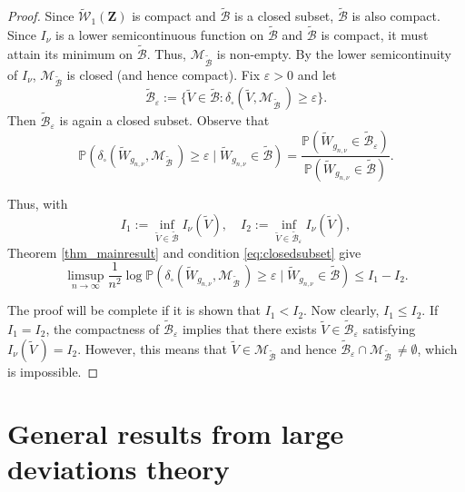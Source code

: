\documentclass[12pt,twoside,a4paper]{article}
\newcommand{\Space}{\mathbf{Z}}
\begin{document}
\begin{proof}
Since $\widetilde{\mathcal{W}}_1(\Space)$ is compact and $\widetilde{\mathcal{B}}$ is a closed subset, $\widetilde{\mathcal{B}}$ is also compact. Since $I_\nu$ is a lower semicontinuous function on $\widetilde{\mathcal{B}}$  and $\widetilde{\mathcal{B}}$ is compact, it must attain its minimum on $\widetilde{\mathcal{B}}$. Thus, $\mathscr{M}_{\widetilde{\mathcal{B}}}$ is non-empty. By the lower semicontinuity of $I_\nu$, $\mathscr{M}_{\widetilde{\mathcal{B}}}$ is closed (and hence compact). Fix $\varepsilon > 0$ and let
\[
\widetilde{\mathcal{B}}_\varepsilon := \{\widetilde{V} \in \widetilde{\mathcal{B}} : \delta_{\square}(\widetilde{V}, \mathscr{M}_{\widetilde{\mathcal{B}}}\,) \geq \varepsilon \}.
\]
Then $\widetilde{\mathcal{B}}_\varepsilon$ is again a closed subset. Observe that
\[
\mathbb{P}(\delta_{\square}(\widetilde{W}_{g_{n,\nu}}, \mathscr{M}_{\widetilde{\mathcal{B}}}\,) \geq \varepsilon \mid \widetilde{W}_{g_{n,\nu}} \in \widetilde{\mathcal{B}}) = \frac{\mathbb{P}(\widetilde{W}_{g_{n,\nu}} \in \widetilde{\mathcal{B}}_\varepsilon)}{\mathbb{P}(\widetilde{W}_{g_{n,\nu}} \in \widetilde{\mathcal{B}})}.
\]

Thus, with
\[
I_1 := \inf_{\widetilde{V} \in \widetilde{\mathcal{B}}} I_\nu(\widetilde{V}), \quad I_2 := \inf_{\widetilde{V} \in \widetilde{\mathcal{B}}_\varepsilon} I_\nu(\widetilde{V}),
\]
Theorem \ref{thm_mainresult} and condition \eqref{eq:closedsubset} give
\[
\limsup_{n \to \infty} \frac{1}{n^2} \log \mathbb{P}(\delta_{\square}(\widetilde{W}_{g_{n,\nu}}, \mathscr{M}_{\widetilde{\mathcal{B}}}\,) \geq \varepsilon \mid \widetilde{W}_{g_{n,\nu}} \in \widetilde{\mathcal{B}}) \leq I_1 - I_2.
\]

The proof will be complete if it is shown that $I_1 < I_2$. Now clearly, $I_1 \leq I_2$. If $I_1 = I_2$, the compactness of $\widetilde{\mathcal{B}}_\varepsilon$ implies that there exists $\widetilde{V} \in \widetilde{\mathcal{B}}_\varepsilon$ satisfying $I_{\nu}(\widetilde{V}\,) = I_2$. However, this means that $\widetilde{V} \in \mathscr{M}_{\widetilde{\mathcal{B}}}$ and hence $\widetilde{\mathcal{B}}_\varepsilon \cap \mathscr{M}_{\widetilde{\mathcal{B}}}\, \neq \emptyset$, which is impossible. 
\end{proof} 

\appendix

\section{General results from large deviations theory}
\end{document}
